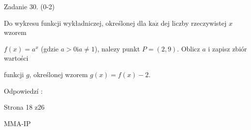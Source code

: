 \documentclass[a4paper,12pt]{article}
\begin{document}
Zadanie 30. (0-2)

Do wykresu funkcji wykładniczej, określonej dla $\mathrm{k}\mathrm{a}\dot{\mathrm{z}}$ dej liczby rzeczywistej $x$ wzorem

$f(x)=a^{x}$ (gdzie $a>0 \mathrm{i} a\neq 1$), nalezy punkt $P=(2,9)$. Oblicz $a$ i zapisz zbiór wartości

funkcji $g$, określonej wzorem $g(x)=f(x)-2.$

Odpowiedzí :

Strona 18 z26

MMA-IP
\end{document}
